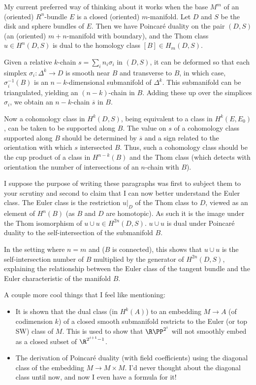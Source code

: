 \documentclass[11pt]{article}
\begin{document}
\begin{CharacteristicClasses}
My current preferred way of thinking about it works when the base $M^m$ of an (oriented) $R^n$-bundle $E$ is a closed (oriented) $m$-manifold. Let $D$ and $S$ be the disk and sphere bundles of $E$. Then we have Poincar\'e duality on the pair $(D,S)$ (an (oriented) $m+n$-manifold with boundary), and the Thom class $u\in H^n(D,S)$ is dual to the homology class $[B]\in H_m(D,S)$.

Given a relative $k$-chain $s=\sum_{i}n_i\sigma_i$ in $(D,S)$, it can be deformed so that each simplex $\sigma_i:\Delta^k\to D$ is smooth near $B$ and transverse to $B$, in which case, $\sigma_i^{-1}(B)$ is an $n-k$-dimensional submanifold of $\Delta^k$. This submanifold can be triangulated, yielding an $(n-k)$-chain in $B$. Adding these up over the simplices $\sigma_i$, we obtain an $n-k$-chain $\overline s$ in $B$. 

Now a cohomology class in $H^k(D,S)$, being equivalent to a class in $H^k(E,E_0)$, can be taken to be supported along $B$. The value on $s$ of a cohomology class supported along $B$ should be determined by $\overline s$ and a sign related to the orientation with which $s$ intersected $B$. Thus, such a cohomology class should be the cup product of a class in $H^{n-k}(B)$ and the Thom class (which detects with orientation the number of intersections of an $n$-chain with $B$).

I suppose the purpose of writing these paragraphs was first to subject them to your scrutiny and second to claim that I can now better understand the Euler class. The Euler class is the restriction $u|_D$ of the Thom class to $D$, viewed as an element of $H^n(B)$ (as $B$ and $D$ are homotopic). As such it is the image under the Thom isomorphism of $u\cup u\in H^{2n}(D,S)$. $u\cup u$ is dual under Poincar\'e duality to the self-intersection of the submanifold $B$.

In the setting where $n=m$ and ($B$ is connected), this shows that $u\cup u$ is the self-intersection number of $B$ multiplied by the generator of $H^{2n}(D,S)$, explaining the relationship between the Euler class of the tangent bundle and the Euler characteristic of the manifold $B$.

A couple more cool things that I feel like mentioning:
\begin{itemize}
\item It is shown that the dual class (in $H^k(A)$) to an embedding $M\to A$ (of codimension $k$) of a closed smooth submanifold restricts to the Euler (or top SW) class of $M$. This is used to show that $\RP^{2^i}$ will not smoothly embed as a closed subset of $\R^{2^{i+1}-1}$.
\item The derivation of Poincar\'e duality (with field coefficients) using the diagonal class of the embedding $M\to M\times M$. I'd never thought about the diagonal class until now, and now I even have a formula for it!
\end{itemize}




\end{CharacteristicClasses}
\end{document}
